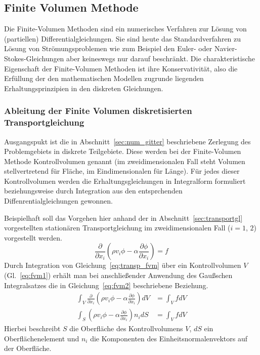 \subsection{Finite Volumen Methode}

Die Finite-Volumen Methoden sind ein numerisches Verfahren zur Lösung von (partiellen)
Differential\-gleich\-ungen. Sie sind heute das Standardverfahren zu Lösung von Strömungsproblemen
wie zum Beispiel den Euler- oder Navier-Stokes-Gleichungen aber keineswegs nur darauf beschränkt.
Die charakteristische Eigenschaft der Finite-Volumen Methoden ist ihre Konservativität, also
die Erfüllung der den mathematischen Modellen zugrunde liegenden Erhaltungsprinzipien in den
diskreten Gleichungen.

\subsubsection{Ableitung der Finite Volumen diskretisierten Transportgleichung}

Ausgangspukt ist die in Abschnitt~\ref{sec:num_gitter} beschriebene Zerlegung des Problemgebiets
in diskrete Teilgebiete. Diese werden bei der Finite-Volumen Methode Kontrollvolumen
genannt (im zweidimensionalen Fall steht Volumen stellvertretend für Fläche,
im Eindimensionalen für Länge).
Für jedes dieser Kontrollvolumen werden die Erhaltungsgleichungen in Integralform formuliert
beziehungsweise durch Integration aus den entsprchenden Diffenrentialgleichungen gewonnen.

Beispielhaft soll das Vorgehen hier anhand der in Abschnitt~\ref{sec:transportgl}
vorgestellten stationären Transportgleichung im zweidimensionalen Fall
($i=1$, $2$) vorgestellt werden.
\begin{equation}
  \frac{\partial}{\partial x_i} \left({\rho v_i \phi
- \alpha \frac{\partial \phi}{\partial x_i} }\right) = f
\label{eq:transp_fvm}
\end{equation}
Durch Integration von Gleichung~\eqref{eq:transp_fvm} über ein Kontrollvolumen $V$ (Gl.~\ref{eq:fvm1})
erhält man bei anschließender Anwendung des Gaußschen Integralsatzes die in Gleichung~\eqref{eq:fvm2} beschriebene Beziehung.
\begin{align}
  \int_V \frac{\partial}{\partial x_i} \left({\rho v_i \phi
- \alpha \frac{\partial \phi}{\partial x_i} }\right) dV &= \int_V f dV \label{eq:fvm1}\\
  \int_S  \left({\rho v_i \phi
- \alpha \frac{\partial \phi}{\partial x_i} }\right) n_i dS&= \int_V f dV \label{eq:fvm2}
\end{align}
Hierbei beschreibt $S$ die Oberfläche des Kontrollvolumens $V$, $dS$ ein Oberflächenelement
und $n_i$ die Komponenten des Einheitsnormalenvektors auf der Oberfläche.

